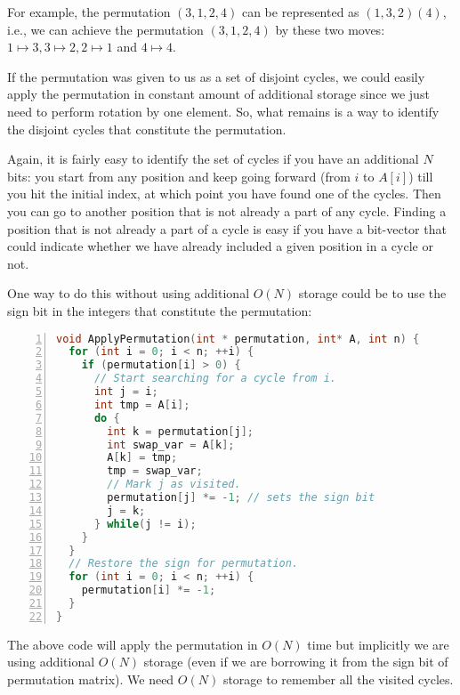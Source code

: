 For example, the permutation $(3,1,2,4)$ can be represented as $(1,3,2)(4)$, i.e., we
can achieve the permutation $(3,1,2,4)$ by these two moves: $1\mapsto 3, 3\mapsto 2, 2\mapsto 1$ and $4\mapsto 4$. 

If the permutation was given to us as a set of disjoint cycles, we could easily apply the
permutation in constant amount of additional storage since we just
need to perform rotation by one element. So, what remains is a way
to identify the disjoint cycles that constitute the permutation. 

Again, it is fairly easy to identify the set of cycles if you have
an additional $N$ bits: you start from any position and keep going
forward (from $i$ to $A[i]$)
till you hit the initial index, at which point you have found one of the
cycles.  Then you can go to another position that is not already a part
of any cycle.  Finding a position that is not already a part of a cycle
is easy if you have a bit-vector that could indicate whether we
have already included a given position in a cycle or not.  

One way to do this without using additional $O(N)$ storage could be to use
the sign bit in the integers that constitute the permutation:
\begin{lstlisting}[basicstyle=\footnotesize,numbers=left,breaklines=true,language=C++]
void ApplyPermutation(int * permutation, int* A, int n) {
  for (int i = 0; i < n; ++i) {
    if (permutation[i] > 0) {
      // Start searching for a cycle from i.
      int j = i;
      int tmp = A[i];
      do {
        int k = permutation[j];
        int swap_var = A[k];
        A[k] = tmp;
        tmp = swap_var;
        // Mark j as visited.
        permutation[j] *= -1; // sets the sign bit
        j = k;
      } while(j != i);
    }
  }
  // Restore the sign for permutation.
  for (int i = 0; i < n; ++i) {
    permutation[i] *= -1;
  }
}
\end{lstlisting}

The above code will apply the permutation in $O(N)$ time but implicitly
we are using additional $O(N)$ storage (even if we are borrowing it
from the sign bit of permutation matrix). 
We need $O(N)$ storage to remember all the visited cycles. 

